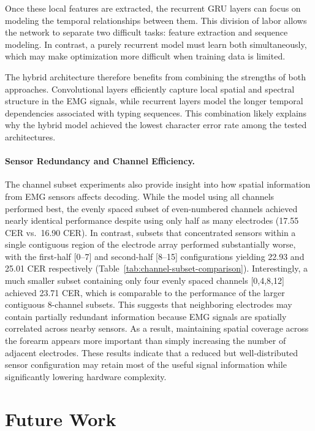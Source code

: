 \documentclass{article}
\begin{document}
Once these local features are extracted, the recurrent GRU layers can focus on modeling the temporal relationships between them. This division of labor allows the network to separate two difficult tasks: feature extraction and sequence modeling. In contrast, a purely recurrent model must learn both simultaneously, which may make optimization more difficult when training data is limited.

The hybrid architecture therefore benefits from combining the strengths of both approaches. Convolutional layers efficiently capture local spatial and spectral structure in the EMG signals, while recurrent layers model the longer temporal dependencies associated with typing sequences. This combination likely explains why the hybrid model achieved the lowest character error rate among the tested architectures.

\paragraph{Sensor Redundancy and Channel Efficiency.}

The channel subset experiments also provide insight into how spatial information from EMG sensors affects decoding. While the model using all channels performed best, the evenly spaced subset of even-numbered channels achieved nearly identical performance despite using only half as many electrodes (17.55 CER vs.\ 16.90 CER). In contrast, subsets that concentrated sensors within a single contiguous region of the electrode array performed substantially worse, with the first-half [0--7] and second-half [8--15] configurations yielding 22.93 and 25.01 CER respectively (Table~\ref{tab:channel-subset-comparison}). Interestingly, a much smaller subset containing only four evenly spaced channels [0,4,8,12] achieved 23.71 CER, which is comparable to the performance of the larger contiguous 8-channel subsets. This suggests that neighboring electrodes may contain partially redundant information because EMG signals are spatially correlated across nearby sensors. As a result, maintaining spatial coverage across the forearm appears more important than simply increasing the number of adjacent electrodes. These results indicate that a reduced but well-distributed sensor configuration may retain most of the useful signal information while significantly lowering hardware complexity.

\section{Future Work}
\end{document}
